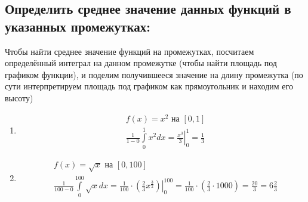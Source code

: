 \documentclass[a4paper, 12pt]{article}
\begin{document}
\subsection{Определить среднее значение данных функций в указанных промежутках:}
Чтобы найти среднее значение функций на промежутках, посчитаем определённый интеграл на данном промежутке (чтобы найти площадь под графиком функции), и поделим получившееся значение на длину промежутка (по сути интерпретируем площадь под графиком как прямоугольник и находим его высоту)
\begin{enumerate}
 \item %
 \begin{align*}  
 &f(x) = x^2 \text{ на } [0,1] \\
 &\frac{1}{1-0}\int\limits_0^1 x^2dx = \left.\frac{x^3}{3}\right|_0^1 = \frac{1}{3}
 \end{align*}
 \item %
 \begin{align*}
  &f(x) = \sqrt{x} \text{ на } [0,100] \\
  &\frac{1}{100-0}\int\limits_0^{100} \sqrt{x}dx = \frac{1}{100}\cdot\left.\left(
  \frac{2}{3}x^\frac{3}{2}\right)\right|_0^{100} = 
  \frac{1}{100}\cdot\left(\frac{2}{3}\cdot 1000\right) = \frac{20}{3} = 
  6\frac{2}{3}
 \end{align*}
\end{enumerate}
\end{document}
